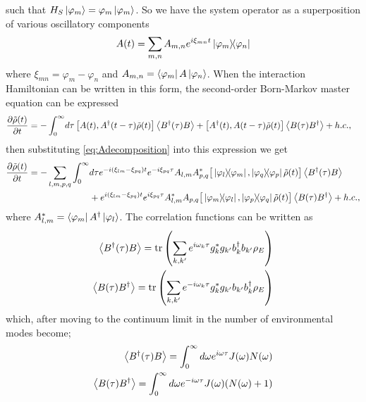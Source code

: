 \documentclass[]{article}
\begin{document}
such that $H_S\ket{\varphi_m}=\varphi_m\ket{\varphi_m}$. So we have the system operator as a superposition of various oscillatory components
\begin{equation}
\label{eq:Adecomposition}
A(t) = \sum_{m,n} A_{m,n} e^{i\xi_{mn}t}\dyad{\varphi_m}{\varphi_n}
\end{equation}
where $\xi_{mn} = \varphi_m - \varphi_n$ and $A_{m,n} = \bra{\varphi_m}A\ket{\varphi_n}$. When the interaction Hamiltonian can be written in this form, the second-order Born-Markov master equation can be expressed
\begin{align}
	\begin{split}
		\label{eq:BornMarkov}
		\pdv{\tilde{\rho}(t)}{t} = - \int_{0}^{\infty}& d\tau  \left[A(t), A^{\dagger}(t-\tau)\tilde{\rho}(t)\right] \expval{B^{\dagger}(\tau)B} + \left[A^{\dagger}(t),A(t-\tau)\tilde{\rho}(t)\right] \expval{B(\tau)B^{\dagger}} + h.c.,
	\end{split}
\end{align}
then substituting \ref{eq:Adecomposition} into this expression we get
\begin{align}
	\begin{split}
		\pdv{\tilde{\rho}(t)}{t} = - \sum_{l,m,p,q}\int_{0}^{\infty}& d\tau e^{-i(\xi_{lm}-\xi_{pq})t} e^{-i\xi_{pq}\tau} A_{l,m}A_{p,q}^{*}\big[\dyad{\varphi_l}{\varphi_m}, \dyad{\varphi_q}{\varphi_p}\tilde{\rho}(t)\big] \expval{B^{\dagger}(\tau)B} \\
		&+ e^{i(\xi_{lm}-\xi_{pq})t} e^{i\xi_{pq}\tau} A_{l,m}^{*}A_{p,q}\big[\dyad{\varphi_m}{\varphi_l}, \dyad{\varphi_p}{\varphi_q}\tilde{\rho}(t)\big] \expval{B(\tau)B^{\dagger}} + h.c.,
	\end{split}
\end{align}
where $A_{l,m}^*=\bra{\varphi_m}A^{\dagger}\ket{\varphi_l}$. The correlation functions can be written as
\begin{align}
	\begin{split}
		\expval{B^{\dagger}(\tau)B} = \tr\left(\sum_{k,k^{\prime}}e^{i\omega_k \tau}g_k^*g_{k^{\prime}} b_k^{\dagger}b_{k^{\prime}}\rho_E\right)\\
		\expval{B(\tau)B^{\dagger}}=\tr\left(\sum_{k,k^{\prime}}e^{-i\omega_k \tau}g_k^*g_{k^{\prime}} b_{k^{\prime}}b_k^{\dagger}\rho_E\right)
	\end{split}
\end{align}
which, after moving to the continuum limit in the number of environmental modes become;
\begin{align}
	\begin{split}
		\expval{B^{\dagger}(\tau)B} = \int_0^{\infty}d\omega e^{i\omega \tau}J(\omega)N(\omega)\\
		\expval{B(\tau)B^{\dagger}}=\int_0^{\infty}d\omega e^{-i\omega \tau}J(\omega)(N(\omega)+1)
	\end{split}
\end{align}
\end{document}
